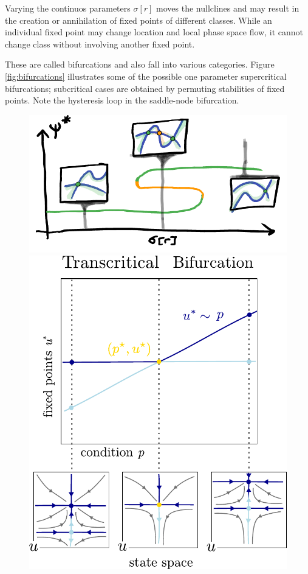 Varying the continuos parameters $\sigma[r]$ moves the nullclines and may result in
the creation or annihilation of fixed points of different classes. While an individual
fixed point may change location and local phase space flow, it cannot change class
without involving another fixed point.

These are called bifurcations and also fall into various categories.
Figure \ref{fig:bifurcations} illustrates some of the possible one parameter
supercritical bifurcations; subcritical cases are obtained by permuting
stabilities of fixed points. Note the hysteresis loop in the saddle-node
bifurcation.
\begin{figure}[H]
\centering{}
\captionsetup{justification=centering}
\includegraphics[scale=0.35]{figures/saddlenode}
\includegraphics[scale=0.35]{figures/transcritical}

\end{figure}
